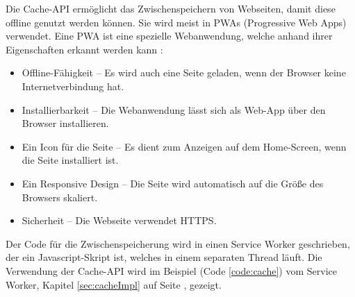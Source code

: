 \label{sec:cache}

Die Cache-API ermöglicht das Zwischenspeichern von Webseiten, damit diese offline genutzt werden können.
Sie wird meist in PWAs (Progressive Web Apps) verwendet. 
Eine PWA ist eine spezielle Webanwendung, welche anhand ihrer Eigenschaften erkannt werden kann \cite{datacodedesignPWA}:
\begin{itemize}
    \item Offline-Fähigkeit -- Es wird auch eine Seite geladen, wenn der Browser keine Internetverbindung hat.
    \item Installierbarkeit -- Die Webanwendung lässt sich als Web-App über den Browser installieren.
    \item Ein Icon für die Seite -- Es dient zum Anzeigen auf dem Home-Screen, wenn die Seite installiert ist.
    \item Ein Responsive Design -- Die Seite wird automatisch auf die Größe des Browsers skaliert.
    \item Sicherheit -- Die Webseite verwendet HTTPS.
\end{itemize}

Der Code für die Zwischenspeicherung wird in einen Service Worker geschrieben, der ein Javascript-Skript ist, welches in einem separaten Thread läuft. 
Die Verwendung der Cache-API wird im Beispiel (Code \ref{code:cache}) vom Service Worker, Kapitel \ref{sec:cacheImpl} auf Seite \pageref{code:cache}, gezeigt.